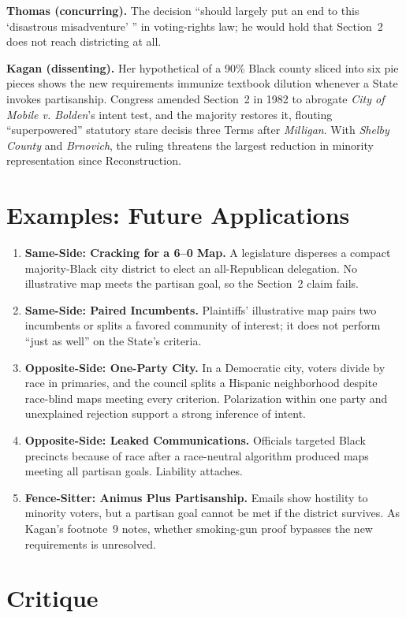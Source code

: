 \documentclass[12pt]{article}
\begin{document}
\textbf{Thomas (concurring).} The decision ``should largely put an end to this `disastrous misadventure' '' in voting-rights law; he would hold that Section~2 does not reach districting at all.

\textbf{Kagan (dissenting).} Her hypothetical of a 90\% Black county sliced into six pie pieces shows the new requirements immunize textbook dilution whenever a State invokes partisanship. Congress amended Section~2 in 1982 to abrogate \textit{City of Mobile v. Bolden}'s intent test, and the majority restores it, flouting ``superpowered'' statutory stare decisis three Terms after \textit{Milligan}. With \textit{Shelby County} and \textit{Brnovich}, the ruling threatens the largest reduction in minority representation since Reconstruction.

\section{Examples: Future Applications}

\begin{enumerate}
\item \textbf{Same-Side: Cracking for a 6--0 Map.} A legislature disperses a compact majority-Black city district to elect an all-Republican delegation. No illustrative map meets the partisan goal, so the Section~2 claim fails.
\item \textbf{Same-Side: Paired Incumbents.} Plaintiffs' illustrative map pairs two incumbents or splits a favored community of interest; it does not perform ``just as well'' on the State's criteria.
\item \textbf{Opposite-Side: One-Party City.} In a Democratic city, voters divide by race in primaries, and the council splits a Hispanic neighborhood despite race-blind maps meeting every criterion. Polarization within one party and unexplained rejection support a strong inference of intent.
\item \textbf{Opposite-Side: Leaked Communications.} Officials targeted Black precincts because of race after a race-neutral algorithm produced maps meeting all partisan goals. Liability attaches.
\item \textbf{Fence-Sitter: Animus Plus Partisanship.} Emails show hostility to minority voters, but a partisan goal cannot be met if the district survives. As Kagan's footnote~9 notes, whether smoking-gun proof bypasses the new requirements is unresolved.
\end{enumerate}

\section{Critique}
\end{document}
